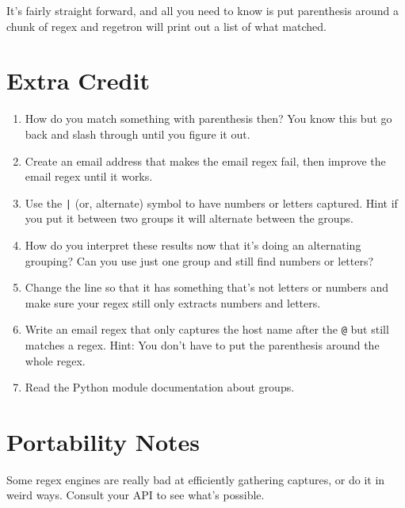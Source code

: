 It's fairly straight forward, and all you need to know is put parenthesis
around a chunk of regex and regetron will print out a list of what matched.

\section{Extra Credit}

\begin{enumerate}
\item How do you match something with parenthesis then?  You know this but go
    back and slash through until you figure it out.
\item Create an email address that makes the email regex fail, then improve the
    email regex until it works.
\item Use the \verb,|, (or, alternate) symbol to have numbers or letters captured.
    Hint if you put it between two groups it will alternate between the groups.
\item How do you interpret these results now that it's doing an alternating grouping?
    Can you use just one group and still find numbers or letters?
\item Change the line so that it has something that's not letters or numbers
    and make sure your regex still only extracts numbers and letters.
\item Write an email regex that only captures the host name after the \verb|@| but
    still matches a regex. Hint: You don't have to put the parenthesis around the
    whole regex.
\item Read the Python  module documentation about groups.
\end{enumerate}

\section{Portability Notes}

Some regex engines are really bad at efficiently gathering captures, or do it
in weird ways.  Consult your API to see what's possible.
